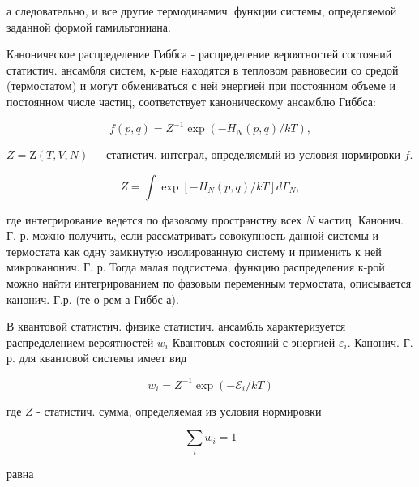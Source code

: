 \documentclass[10pt]{article}
\begin{document}
а следовательно, и все другие термодинамич. функции системы, определяемой заданной формой гамильтониана.



Каноническое распределение Гиббса - распределение вероятностей состояний статистич. ансамбля систем, к-рые находятся в тепловом равновесии со средой (термостатом) и могут обмениваться с ней энергией при постоянном объеме и постоянном числе частиц, соответствует каноническому ансамблю Гиббса:



\[

f(p, q)=Z^{-1} \exp \left(-H_{N}(p, q) / k T\right),

\]



$Z=\mathrm{Z}(T, V, N)-$ статистич. интеграл, определяемый из условия нормировки $f$.



\[

Z=\int \exp \left[-H_{N}(p, q) / k T\right] d \Gamma_{N},

\]



где интегрирование ведется по фазовому пространству всех $N$ частиц. Канонич. Г. р. можно получить, если рассматривать совокупность данной системы и термостата как одну замкнутую изолированную систему и применить к ней микроканонич. Г. р. Тогда малая подсистема, функцию распределения к-рой можно найти интегрированием по фазовым переменным термостата, описывается канонич. Г.р. (те о рем а Гиббс а).



В квантовой статистич. физике статистич. ансамбль характеризуется распределением вероятностей $w_{i}$ Квантовых состояний с энергией $\varepsilon_{i}$. Канонич. Г. р. для квантовой системы имеет вид



\[

w_{i}=Z^{-1} \exp \left(-\mathscr{E}_{i} / k T\right)

\]



где $Z$ - статистич. сумма, определяемая из условия нормировки



\[

\sum_{i} w_{i}=1

\]



равна
\end{document}
